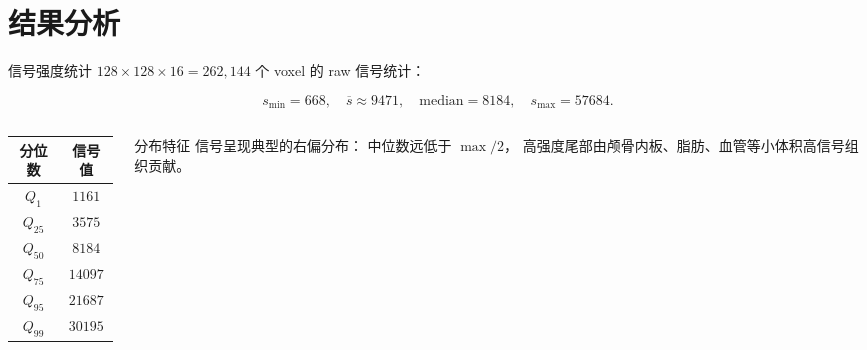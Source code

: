 \documentclass[aspectratio=169,11pt]{ctexbeamer}
\begin{document}
\section{结果分析}

\begin{frame}{信号强度统计}
  \small
  $128\times 128\times 16 = 262{,}144$ 个 voxel 的 raw 信号统计：

  \[
    s_{\min}=668,\quad
    \overline s\approx 9471,\quad
    \mathrm{median}=8184,\quad
    s_{\max}=57684 .
  \]

  \begin{columns}
    \begin{column}{0.48\linewidth}
      \begin{tabular}{cc}
        \toprule
        分位数 & 信号值 \\
        \midrule
        $Q_{1}$ & $1161$\\
        $Q_{25}$ & $3575$\\
        $Q_{50}$ & $8184$\\
        $Q_{75}$ & $14097$\\
        $Q_{95}$ & $21687$\\
        $Q_{99}$ & $30195$\\
        \bottomrule
      \end{tabular}
    \end{column}
    \begin{column}{0.48\linewidth}
      \begin{block}{分布特征}
        信号呈现典型的右偏分布：
        中位数远低于 $\max/2$，
        高强度尾部由颅骨内板、脂肪、血管等小体积高信号组织贡献。
      \end{block}
    \end{column}
  \end{columns}
\end{frame}
\end{document}
